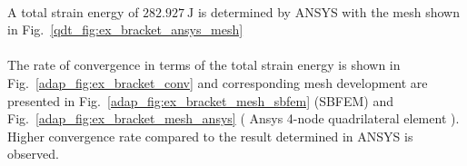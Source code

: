 \paragraph{}
A total strain energy of $\SI{282.927}{\joule}$ is determined by ANSYS with the mesh shown in Fig.~\ref{qdt_fig:ex_bracket_ansys_mesh}












\paragraph{}
The rate of convergence in terms of the total strain energy is shown in Fig.~\ref{adap_fig:ex_bracket_conv} and corresponding mesh development are presented in Fig.~\ref{adap_fig:ex_bracket_mesh_sbfem} (SBFEM) and Fig.~\ref{adap_fig:ex_bracket_mesh_ansys} ( Ansys 4-node quadrilateral element ).
Higher convergence rate compared to the result determined in ANSYS is observed.

